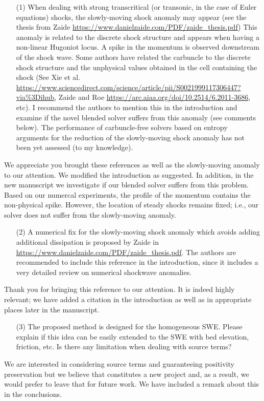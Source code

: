 \documentclass[english,11pt]{article}
\begin{document}
\bigskip
{\color{OliveGreen}
  \begin{itemize}
  \item[(1)]
    When dealing with strong transcritical (or transonic, in the case of Euler equations) shocks, 
    the slowly-moving shock anomaly may appear 
    (see the thesis from Zaide \url{https://www.danielzaide.com/PDF/zaide_thesis.pdf})
    This anomaly is related to the discrete shock structure and appears when having a non-linear Hugoniot locus. 
    A spike in the momentum is observed downstream of the shock wave. Some authors have related the carbuncle to 
    the discrete shock structure and the unphysical values obtained in the cell containing the shock 
    (See Xie et al. \url{https://www.sciencedirect.com/science/article/pii/S0021999117306447?via\%3Dihub},
    Zaide and Roe \url{https://arc.aiaa.org/doi/10.2514/6.2011-3686}, etc). I recommend the authors to mention 
    this in the introduction and examine if the novel blended solver suffers from this anomaly (see comments below). 
    The performance of carbuncle-free solvers based on entropy arguments for the reduction of the slowly-moving 
    shock anomaly has not been yet assessed (to my knowledge).
  \end{itemize}
}
\noindent
We appreciate you brought these references as well as the slowly-moving anomaly to our attention.
We modified the introduction as suggested. In addition, in the new manuscript we investigate 
if our blended solver suffers from this problem. 
Based on our numercal experiments, the profile of the momentum contains the non-physical spike.
However, the location of steady shocks remains fixed; i.e., our solver does not suffer from 
the slowly-moving anomaly. 

\bigskip
{\color{OliveGreen}
  \begin{itemize}
  \item[(2)]
    A numerical fix for the slowly-moving shock anomaly which avoids adding additional dissipation is proposed 
    by Zaide in \url{https://www.danielzaide.com/PDF/zaide_thesis.pdf}.
    The authors are recommended to include this reference in the introduction, 
    since it includes a very detailed review on numerical shockwave anomalies.
  \end{itemize}
}
\noindent
Thank you for bringing this reference to our attention.  It is indeed highly relevant; we have
added a citation in the introduction as well as in appropriate places later in the manuscript.

\bigskip
{\color{OliveGreen}
  \begin{itemize}
  \item[(3)]
    The proposed method is designed for the homogeneous SWE. 
    Please explain if this idea can be easily extended to the SWE with bed elevation, friction, etc. 
    Is there any limitation when dealing with source terms?
  \end{itemize}
}
\noindent
We are interested in considering source terms and guaranteeing positivity preservation but 
we believe that constitutes a new project and, as a result, we would prefer to leave that 
for future work. We have included a remark about this in the conclusions. 
      
\end{document}
